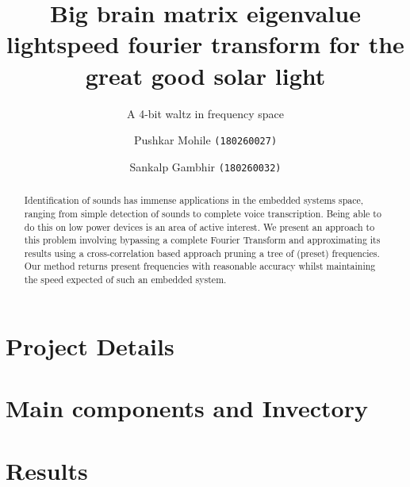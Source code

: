 \documentclass{llncs}
\title{Big brain matrix eigenvalue lightspeed fourier transform for the great good solar light}
\subtitle{A 4-bit waltz in frequency space}
\author{Pushkar Mohile \texttt{(180260027)} \and Sankalp Gambhir \texttt{(180260032)}}
\institute{Indian Institute of Technology, Bombay}
\begin{document}
    \maketitle

    \begin{abstract}
    Identification of sounds has immense applications in the embedded systems
    space, ranging from simple detection of sounds to complete voice
    transcription. Being able to do this on low power devices is an area of
    active interest. We present an approach to this problem involving bypassing
    a complete Fourier Transform and approximating its results using a
    cross-correlation based approach pruning a tree of (preset) frequencies. Our
    method returns present frequencies with reasonable accuracy whilst
    maintaining the speed expected of such an embedded system.
    \end{abstract}

    \section{Project Details}
        

    \section{Main components and Invectory}
        

    \section{Results}
        

    \newpage
        
\end{document}
